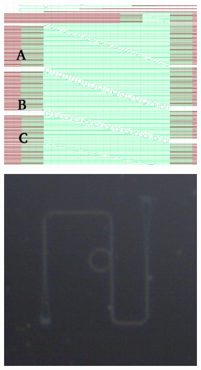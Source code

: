 \begingroup
    \centering  
    \includegraphics[width=10cm]{img/method/glassgowChipNumbering.png}
     \vspace{3pt} \label{crossCompare}
\endgroup

\begingroup
    \centering  
    \includegraphics[width=10cm]{img/method/chipPictures/exampleASIRing.png}
     \vspace{3pt} \label{crossCompare}
\endgroup


